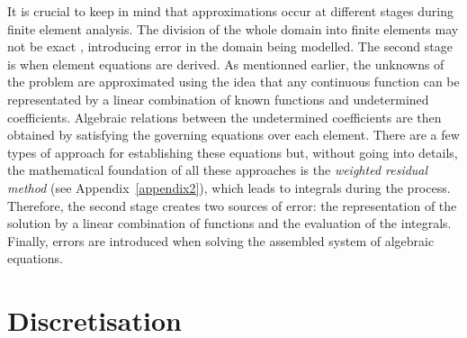 It is crucial to keep in mind that approximations occur at different stages during finite element analysis. The division of the whole domain into finite elements may not be exact , introducing error in the domain being modelled. The second stage is when element equations are derived. As mentionned earlier, the unknowns of the problem are approximated using the idea that any continuous function can be representated by a linear combination of known functions and undetermined coefficients. Algebraic relations between the undetermined coefficients are then obtained by satisfying the governing equations over each element. There are a few types of approach for establishing these equations but, without going into details, the mathematical foundation of all these approaches is the \emph{weighted residual method} (see Appendix~\ref{appendix2}), which leads to integrals during the process. Therefore, the second stage creates two sources of error: the representation of the solution by a linear combination of functions and the evaluation of the integrals. Finally, errors are introduced when solving the assembled system of algebraic equations. 


\section{Discretisation}

